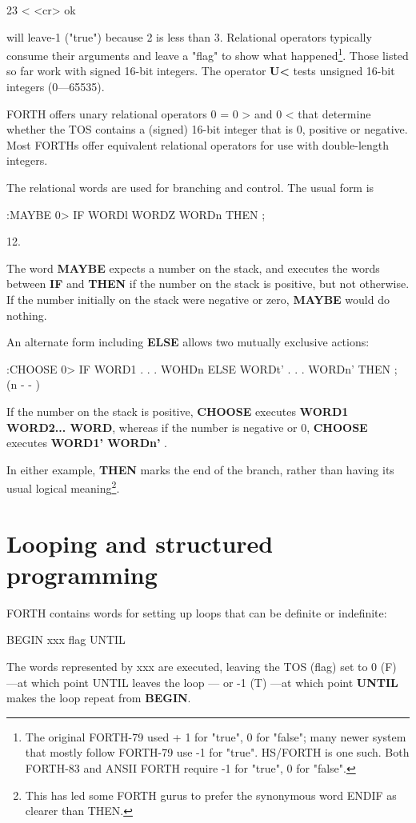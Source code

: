23 < <cr> ok

will leave-1 ("true") because 2 is less than 3. Relational operators typically consume their arguments and leave a "ﬂag" to show what happened\footnote{ The original FORTH-79 used + 1 for "true", 0 for "false"; many newer system that mostly follow FORTH-79 use -1 for "true". HS/FORTH is one such. Both FORTH-83 and ANSII FORTH require -1 for "true", 0 for "false".}. Those listed so far work with signed 16-bit integers. The operator \textbf{U<} tests unsigned 16-bit integers (0—65535).

FORTH offers unary relational operators 0 = 0 > and 0 < that determine whether the TOS contains a (signed) 16-bit integer that is 0, positive or negative. Most FORTHs offer equivalent relational operators for use with double-length integers.

The relational words are used for branching and control. The usual form is

:MAYBE 0> IF WORDl WORDZ
WORDn THEN ;

12.

The word \textbf{MAYBE} expects a number on the stack, and executes the words between \textbf{IF} and \textbf{THEN} if the number on the stack is positive, but not otherwise. If the number initially on the stack were negative or zero, \textbf{MAYBE} would do nothing.

An alternate form including \textbf{ELSE} allows two mutually exclusive actions:

:CHOOSE 0> IF WORD1 . . . WOHDn
ELSE WORDt' . . . WORDn'
THEN ; (n - - )

If the number on the stack is positive, \textbf{CHOOSE} executes \textbf{WORD1 WORD2... WORD}, whereas if the number is negative or 0, \textbf{CHOOSE} executes \textbf{WORD1' WORDn'} .

In either example, \textbf{THEN} marks the end of the branch, rather than having its usual logical meaning\footnote{This has led some FORTH gurus to prefer the synonymous word ENDIF as clearer than THEN.}.

\section{Looping and structured programming}

FORTH contains words for setting up loops that can be definite or indefinite:

BEGIN xxx ﬂag UNTIL

The words represented by xxx are executed, leaving the TOS (ﬂag) set to 0 (F) —at which point UNTIL leaves the loop — or -1 (T) —at which point \textbf{UNTIL} makes the loop repeat from \textbf{BEGIN}.

